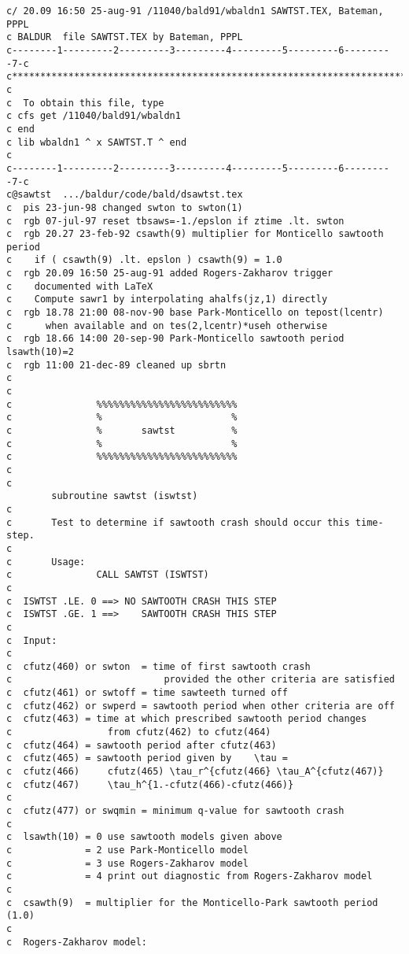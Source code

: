 \begin{verbatim}
c/ 20.09 16:50 25-aug-91 /11040/bald91/wbaldn1 SAWTST.TEX, Bateman,  PPPL
c BALDUR  file SAWTST.TEX by Bateman, PPPL
c--------1---------2---------3---------4---------5---------6---------7-c
c**********************************************************************c
c
c  To obtain this file, type
c cfs get /11040/bald91/wbaldn1
c end
c lib wbaldn1 ^ x SAWTST.T ^ end
c
c--------1---------2---------3---------4---------5---------6---------7-c
c@sawtst  .../baldur/code/bald/dsawtst.tex
c  pis 23-jun-98 changed swton to swton(1)
c  rgb 07-jul-97 reset tbsaws=-1./epslon if ztime .lt. swton
c  rgb 20.27 23-feb-92 csawth(9) multiplier for Monticello sawtooth period
c    if ( csawth(9) .lt. epslon ) csawth(9) = 1.0
c  rgb 20.09 16:50 25-aug-91 added Rogers-Zakharov trigger
c    documented with LaTeX
c    Compute sawr1 by interpolating ahalfs(jz,1) directly
c  rgb 18.78 21:00 08-nov-90 base Park-Monticello on tepost(lcentr)
c      when available and on tes(2,lcentr)*useh otherwise
c  rgb 18.66 14:00 20-sep-90 Park-Monticello sawtooth period lsawth(10)=2
c  rgb 11:00 21-dec-89 cleaned up sbrtn
c
c
c               %%%%%%%%%%%%%%%%%%%%%%%%%
c               %                       %
c               %       sawtst          %
c               %                       %
c               %%%%%%%%%%%%%%%%%%%%%%%%%
c
c
        subroutine sawtst (iswtst)
c
c       Test to determine if sawtooth crash should occur this time-step.
c
c       Usage:
c               CALL SAWTST (ISWTST)
c
c  ISWTST .LE. 0 ==> NO SAWTOOTH CRASH THIS STEP
c  ISWTST .GE. 1 ==>    SAWTOOTH CRASH THIS STEP
c
c  Input:
c
c  cfutz(460) or swton  = time of first sawtooth crash 
c                           provided the other criteria are satisfied
c  cfutz(461) or swtoff = time sawteeth turned off
c  cfutz(462) or swperd = sawtooth period when other criteria are off
c  cfutz(463) = time at which prescribed sawtooth period changes
c                 from cfutz(462) to cfutz(464)
c  cfutz(464) = sawtooth period after cfutz(463)
c  cfutz(465) = sawtooth period given by    \tau = 
c  cfutz(466)     cfutz(465) \tau_r^{cfutz(466} \tau_A^{cfutz(467)}
c  cfutz(467)     \tau_h^{1.-cfutz(466)-cfutz(466)}
c
c  cfutz(477) or swqmin = minimum q-value for sawtooth crash
c
c  lsawth(10) = 0 use sawtooth models given above
c             = 2 use Park-Monticello model
c             = 3 use Rogers-Zakharov model
c             = 4 print out diagnostic from Rogers-Zakharov model
c
c  csawth(9)  = multiplier for the Monticello-Park sawtooth period (1.0)
c
c  Rogers-Zakharov model:

\end{verbatim}
